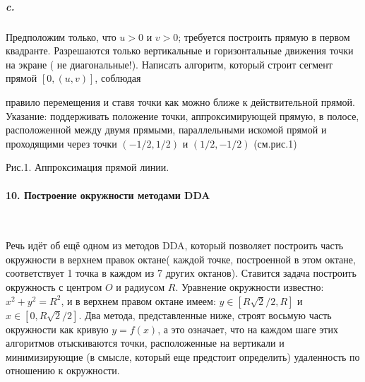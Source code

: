 \subparagraph { c.} Предположим только, что $u>0$ и $v>0$; требуется построить прямую в первом квадранте. Разрешаются только вертикальные и горизонтальные движения точки на экране ( не диагональные!). Написать алгоритм, который строит сегмент прямой $\left[{0,\left({u,v}\right)}\right]$, соблюдая 

\newpage

правило перемещения и ставя точки как можно ближе к действительной прямой. Указание: поддерживать положение точки, аппроксимирующей прямую, в полосе, расположенной между двумя прямыми, параллельными искомой прямой и проходящими через точки $\left({-1/2,1/2}\right)$ и $\left({1/2,-1/2}\right)$ (см.рис.1) 

\begin{center}
\end{center}
\begin{center}
Рис.1. Аппроксимация прямой линии. 
\end{center}

\paragraph { 10. Построение окружности методами DDA}\ \newline

Речь идёт об ещё одном из методов DDA, который позволяет построить часть окружности в верхнем правок октане( каждой точке, построенной в этом октане, соответствует 1 точка в каждом из 7 других октанов). Ставится задача построить окружность с центром $O$ и радиусом $R$. Уравнение окружности известно: $x^{2}+y^{2}=R^{2}$, и в верхнем правом октане имеем: $y\in{\left[{R\sqrt{2}/2,R}\right]}$ и $ x\in{\left[{0,R\sqrt{2}/2}\right]}$. Два метода, представленные ниже, строят восьмую часть окружности как кривую $y=f\left({x}\right)$, а это означает, что на каждом шаге этих алгоритмов отыскиваются точки, расположенные на вертикали и минимизирующие (в смысле, который еще предстоит определить) удаленность по отношению к окружности. 

